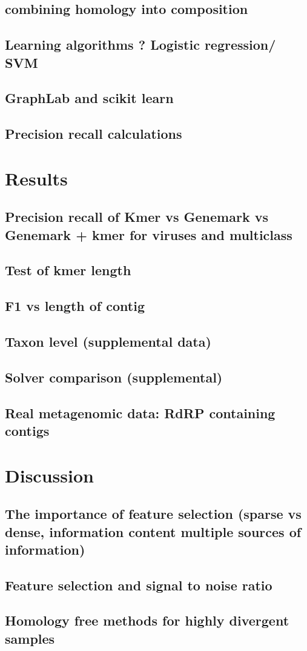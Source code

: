 \documentclass{article}
\begin{document}
\subsection{combining homology into composition}
\subsection{Learning algorithms ? Logistic regression/ SVM}
\subsection{GraphLab and scikit learn}
\subsection{Precision recall calculations}

\section{Results}
\subsection{Precision recall of Kmer  vs Genemark vs Genemark + kmer for viruses and multiclass}
\subsection{Test of kmer length}
\subsection{F1 vs length of contig}
\subsection{Taxon level (supplemental data)}
\subsection{Solver comparison (supplemental)}
\subsection{Real metagenomic data: RdRP containing contigs}

\section{Discussion}
\subsection{The importance of feature selection (sparse vs dense, information content multiple sources of information)}
\subsection{Feature selection and signal to noise ratio}
\subsection{Homology free methods for highly divergent samples}



%
\end{document}
